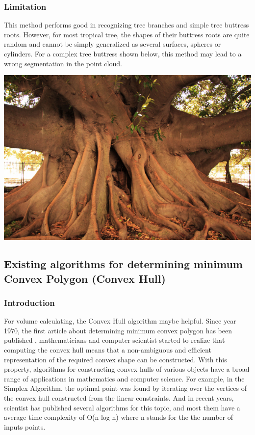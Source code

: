 \documentclass[runningheads,a4paper]{llncs}
\begin{document}
\subsubsection{Limitation}
This method performs good in recognizing tree branches and simple tree buttress roots. However, for most tropical tree, the shapes of their buttress roots are quite random and cannot be simply generalized as several surfaces, spheres or cylinders. For a complex tree buttress shown below, this method may lead to a wrong segmentation in the point cloud.
\\
\begin{minipage}{1\linewidth}
  \centering
  \includegraphics[scale=1]{complex_buttress.jpg}
  \label{fig:Complex tree buttress}
\end{minipage}

\subsection{Existing algorithms for determining minimum Convex Polygon (Convex Hull)} 
\subsubsection{Introduction}
For volume calculating, the Convex Hull algorithm maybe helpful. Since year 1970,  the first article about determining minimum convex polygon has been published \cite{7}, mathematicians and computer scientist started to realize that computing the convex hull means that a non-ambiguous and efficient representation of the required convex shape can be constructed. With this property, algorithms for constructing convex hulls of various objects have a broad range of applications in mathematics and computer science. For example, in the Simplex Algorithm, the optimal point was found by iterating over the vertices of the convex hull constructed from the linear constraints. And in recent years, scientist has published several algorithms for this topic, and most them have a average time complexity of O(n log n) where n stands for the the number of inputs points.
\end{document}
